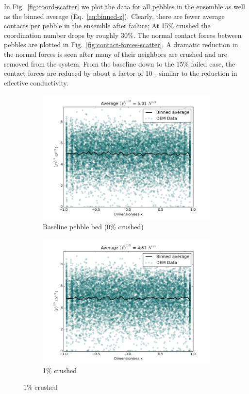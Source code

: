 In Fig.~\ref{fig:coord-scatter} we plot the data for all pebbles in the ensemble as well as the binned average (Eq.~\ref{eq:binned-z}). Clearly, there are fewer average contacts per pebble in the ensemble after failure; At 15\% crushed the coordination number drops by roughly 30\%. The normal contact forces between pebbles are plotted in Fig.~\ref{fig:contact-forces-scatter}. A dramatic reduction in the normal forces is seen after many of their neighbors are crushed and are removed from the system. From the baseline down to the 15\% failed case, the contact forces are reduced by about a factor of 10 - similar to the reduction in effective conductivity.


\begin{figure}[!ht]
	\centering
	\begin{subfigure}[b]{0.4\textwidth}
		\centering
		\includegraphics[width=\textwidth]{chapters/figures/heating_dte-02/0/dump/force-profile.png}
		\caption{Baseline pebble bed (0\% crushed)}
	\end{subfigure}
	\begin{subfigure}[b]{0.4\textwidth}
		\centering
		\includegraphics[width=\textwidth]{chapters/figures/heating_dte-02/1/dump/force-profile.png}
		\caption{1\% crushed}
	\end{subfigure}
	

\end{figure}
